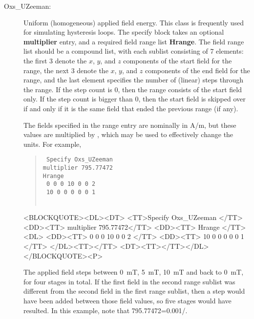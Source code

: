 \begin{description}
\item[Oxs\_UZeeman:\label{HTMLUZeeman}]
%
   Uniform (homogeneous) applied field energy.  This class is frequently
   used for simulating hysteresis loops.  The specify block takes an
   optional \textbf{multiplier} entry, and a required field range list
   \textbf{Hrange}.  The field range list should be a compound list,
   with each sublist consisting of 7 elements: the first 3 denote the
   $x$, $y$, and $z$ components of the start field for the range, the
   next 3 denote the $x$, $y$, and $z$ components of the end field for
   the  range, and the last element specifies the number of (linear) steps
   through the range.  If the step count is 0, then the range consists
   of the start field only.  If the step count is bigger than 0, then
   the start field is skipped over if and only if it is the same field
   that ended the previous range (if any).

   The fields specified in the range entry are nominally in A/m, but
   these values are multiplied by , which may be used to
   effectively change the units.  For example,
   \begin{latexonly}
      \begin{quote}\tt
      Specify Oxs\_UZeeman \ocb \\
         \bi multiplier 795.77472\\
         \bi Hrange \ocb\\
         \bi\bi \ocb\ 0 0 0 10 0 0 2 \ccb\\
         \bi\bi \ocb\ 10 0 0 0 0 0 1 \ccb\\
         \bi\ccb\\
      \ccb
      \end{quote}
   \end{latexonly}
   \begin{rawhtml}
   <BLOCKQUOTE><DL><DT>
      <TT>Specify Oxs_UZeeman {</TT>
         <DD><TT> multiplier 795.77472</TT>
         <DD><TT> Hrange {</TT><DL>
              <DD><TT> { 0 0 0 10 0 0 2 }</TT>
              <DD><TT> { 10 0 0 0 0 0 1 }</TT>
         </DL><TT>}</TT>
   <DT><TT>}</TT></DL></BLOCKQUOTE><P>
   \end{rawhtml}
   The applied field steps between 0~mT, 5~mT, 10~mT and back to 0~mT,
   for four stages in total.  If the first field in the second range
   sublist was different from the second field in the first range
   sublist, then a step would have been added between those field
   values, so five stages would have resulted.  In this example, note
   that 795.77472=0.001/\munaught.


\end{description}
